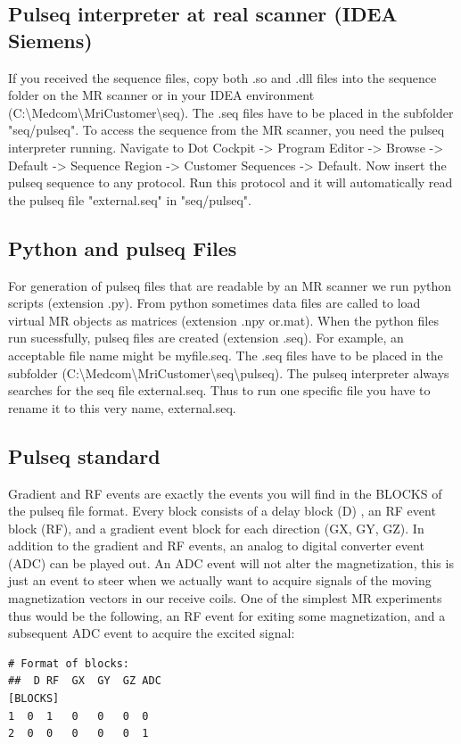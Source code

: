 \documentclass[a4paper,12pt]{extarticle}
\begin{document}
\subsection{Pulseq interpreter at real scanner (IDEA Siemens)}
            If you received the sequence files, copy both .so and .dll files into the sequence folder on the MR scanner or in your IDEA environment (C:\textbackslash Medcom\textbackslash MriCustomer\textbackslash seq). The .seq files have to be placed in the subfolder "seq/pulseq".
            To access the sequence from the MR scanner, you need the pulseq interpreter running. Navigate to Dot Cockpit -> Program Editor -> Browse -> Default -> Sequence Region -> Customer Sequences -> Default. Now insert the pulseq sequence to any protocol. Run this protocol and it will automatically read the pulseq file "external.seq" in "seq/pulseq".
            
\subsection{Python and pulseq Files}
			For generation of pulseq files that are readable by an MR scanner we run python scripts (extension .py). From python sometimes data files are called to load virtual MR objects as matrices (extension .npy or.mat). When the python files run sucessfully, pulseq files are created (extension .seq). For example, an acceptable file name might be myfile.seq. 
            The .seq files have to be placed in the subfolder (C:\textbackslash Medcom\textbackslash MriCustomer\textbackslash seq\textbackslash pulseq). The pulseq interpreter always searches for the seq file external.seq. Thus to run one specific file you have to rename it to this very name, external.seq.
 
 
\subsection{ Pulseq standard}
Gradient and RF events are exactly the events you will find in the BLOCKS of the pulseq file format. Every block consists of a delay block (D) , an RF event block (RF), and a gradient event block for each direction (GX, GY, GZ). In addition to the gradient and RF events, an analog to digital converter event (ADC) can be played out. An ADC event will not alter the magnetization, this is just an event to steer when we actually want to acquire signals of the moving magnetization vectors in our receive coils. One of the simplest MR experiments thus would be the following,  an RF event for exiting some magnetization, and a subsequent ADC event to acquire the excited signal: 
\begin{lstlisting}
# Format of blocks:
##  D RF  GX  GY  GZ ADC
[BLOCKS]
1  0  1   0   0   0  0
2  0  0   0   0   0  1
\end{lstlisting}
\end{document}
